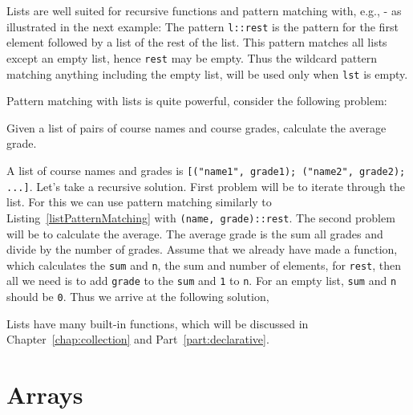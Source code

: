Lists are well suited for recursive functions and pattern matching with, e.g., - as illustrated in the next example:
%
%
The pattern \lstinline!l::rest! is the pattern for the first element followed by a list of the rest of the list. This pattern matches all lists except an empty list, hence \lstinline!rest! may be empty. Thus the wildcard pattern matching anything including the empty list, will be used only when \lstinline!lst! is empty.

Pattern matching with lists is quite powerful, consider the following problem:
\begin{problem}
  Given a list of pairs of course names and course grades, calculate the average grade.
\end{problem}
A list of course names and grades is \lstinline![("name1", grade1); ("name2", grade2); ...]!. Let's take a recursive solution. First problem will be to iterate through the list. For this we can use pattern matching similarly to Listing~\ref{listPatternMatching} with \lstinline!(name, grade)::rest!. The second problem will be to calculate the average. The average grade is the sum all grades and divide by the number of grades. Assume that we already have made a function, which calculates the \lstinline!sum! and \lstinline!n!, the sum and number of elements, for \lstinline!rest!, then all we need is to add \lstinline!grade! to the \lstinline!sum! and \lstinline!1! to \lstinline!n!. For an empty list, \lstinline!sum! and \lstinline!n! should be \lstinline!0!. Thus we arrive at the following solution,
%
%

Lists have many built-in functions, which will be discussed in Chapter~\ref{chap:collection} and Part~\ref{part:declarative}.

\section{Arrays}
